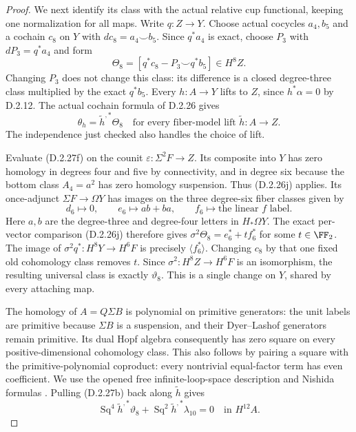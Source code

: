 \begin{proof}
We next identify its class with the actual relative cup
functional, keeping one normalization for all maps.
Write $q:Z\to Y$. Choose actual cocycles $a_4,b_5$ and a
cochain $c_8$ on $Y$ with $dc_8=a_4\smile b_5$.
Since $q^*a_4$ is exact, choose $P_3$ with
$dP_3=q^*a_4$ and form
\[
 \Theta_8=[q^*c_8-P_3\smile q^*b_5]\in H^8Z.
 \tag{D.2.27f}
\]
Changing $P_3$ does not change this class: its difference
is a closed degree-three class multiplied by the exact
$q^*b_5$. Every $h:A\to Y$ lifts to $Z$, since
$h^*\alpha=0$ by \textup{D.2.12}. The actual cochain formula
of \textup{D.2.26} gives
\[
 \theta_h=\widetilde h^{,*}\Theta_8
 \quad\text{for every fiber-model lift }\widetilde h:A\to Z.
 \tag{D.2.27g}
\]
The independence just checked also handles the choice of lift.

Evaluate \textup{(D.2.27f)} on the counit
$\varepsilon:\Sigma^2F\to Z$. Its composite into $Y$ has
zero homology in degrees four and five by connectivity,
and in degree six because the bottom class $A_4=a^2$
has zero homology suspension. Thus \textup{(D.2.26j)} applies.
Its once-adjunct $\Sigma F\to\Omega Y$ has images on the
three degree-six fiber classes given by
\[
 d_6\longmapsto0,\qquad e_6\longmapsto ab+ba,
       \qquad f_6\longmapsto \text{the linear }f\text{ label}.
 \tag{D.2.27h}
\]
Here $a,b$ are the degree-three and degree-four letters in
$H_*\Omega Y$. The exact per-vector comparison
\textup{(D.2.26j)} therefore gives
$\sigma^2\Theta_8=e_6^*+t f_6^*$ for some $t\in\FF_2$.
The image of $\sigma^2q^*:H^8Y\to H^6F$ is precisely
$\langle f_6^*\rangle$. Changing $c_8$ by that one fixed
old cohomology class removes $t$. Since
$\sigma^2:H^8Z\to H^6F$ is an isomorphism, the resulting
universal class is exactly $\vartheta_8$.
This is a single change on $Y$, shared by every attaching map.

The homology of $A=Q\Sigma B$ is polynomial on primitive
generators: the unit labels are primitive because $\Sigma B$
is a suspension, and their Dyer--Lashof generators remain
primitive. Its dual Hopf algebra consequently has zero square
on every positive-dimensional cohomology class. This also
follows by pairing a square with the primitive-polynomial
coproduct: every nontrivial equal-factor term has even
coefficient. We use the opened free infinite-loop-space
description and Nishida formulas
\cite[Chapters I and III]{I_CohenLadaMay1976}.
Pulling \textup{(D.2.27b)} back along $\widetilde h$ gives
\[
 \operatorname{Sq}^4\widetilde h^{,*}\vartheta_8+
 \operatorname{Sq}^2\widetilde h^{,*}\lambda_{10}=0
                         \quad\text{in }H^{12}A.
 \tag{D.2.27i}
\]


\end{proof}
